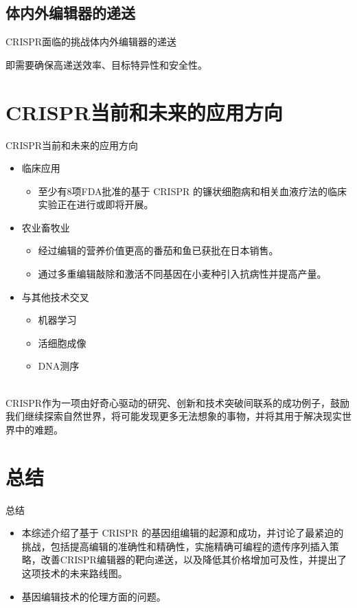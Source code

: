\documentclass{beamer}
\begin{document}
	\subsection{体内外编辑器的递送}
	\begin{frame}{CRISPR面临的挑战}{体内外编辑器的递送}
		
		即需要确保高递送效率、目标特异性和安全性。

	\end{frame}
	

	\section{CRISPR当前和未来的应用方向}
	\begin{frame}{CRISPR当前和未来的应用方向}
		\begin{itemize}
			\item 临床应用
			\begin{itemize}
				\item 至少有8项FDA批准的基于 CRISPR 的镰状细胞病和相关血液疗法的临床实验正在进行或即将开展。
			\end{itemize}
			\item 农业畜牧业
			\begin{itemize}
				\item 经过编辑的营养价值更高的番茄和鱼已获批在日本销售。
				\item 通过多重编辑敲除和激活不同基因在小麦种引入抗病性并提高产量。
			\end{itemize}
			\item 与其他技术交叉
			\begin{itemize}
				\item 机器学习
				\item 活细胞成像
				\item DNA测序
			\end{itemize}
		\end{itemize}

		\quad\\

		CRISPR作为一项由好奇心驱动的研究、创新和技术突破间联系的成功例子，鼓励我们继续探索自然世界，将可能发现更多无法想象的事物，并将其用于解决现实世界中的难题。
	\end{frame}



	\section*{总结}
	\begin{frame}{总结}
		\begin{itemize}
			\item 本综述介绍了基于 CRISPR 的基因组编辑的起源和成功，并讨论了最紧迫的挑战，包括提高编辑的准确性和精确性，实施精确可编程的遗传序列插入策略，改善CRISPR编辑器的靶向递送，以及降低其价格增加可及性，并提出了这项技术的未来路线图。
			\item 基因编辑技术的伦理方面的问题。
		\end{itemize}
	
	\end{frame}
\end{document}
